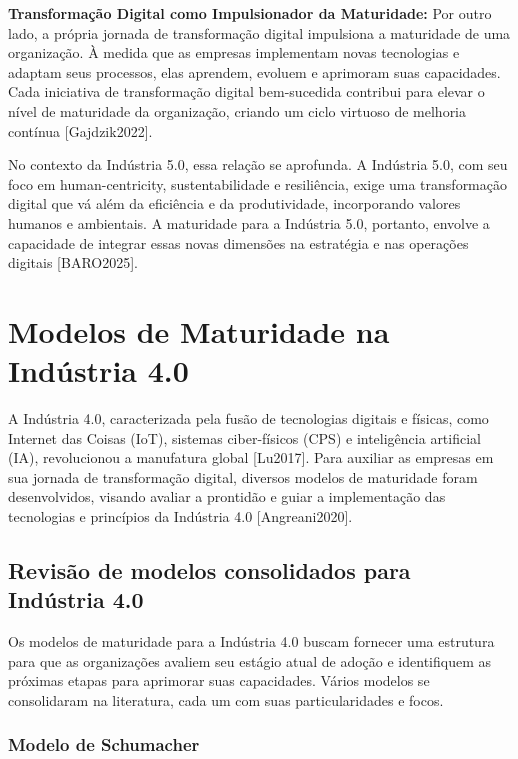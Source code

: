 \textbf{Transformação Digital como Impulsionador da Maturidade:}
Por outro lado, a própria jornada de transformação digital impulsiona a maturidade de uma organização. À medida que as empresas implementam novas tecnologias e adaptam seus processos, elas aprendem, evoluem e aprimoram suas capacidades. Cada iniciativa de transformação digital bem-sucedida contribui para elevar o nível de maturidade da organização, criando um ciclo virtuoso de melhoria contínua [Gajdzik2022].

No contexto da Indústria 5.0, essa relação se aprofunda. A Indústria 5.0, com seu foco em human-centricity, sustentabilidade e resiliência, exige uma transformação digital que vá além da eficiência e da produtividade, incorporando valores humanos e ambientais. A maturidade para a Indústria 5.0, portanto, envolve a capacidade de integrar essas novas dimensões na estratégia e nas operações digitais [BARO2025].





\section{Modelos de Maturidade na Indústria 4.0}

A Indústria 4.0, caracterizada pela fusão de tecnologias digitais e físicas, como Internet das Coisas (IoT), sistemas ciber-físicos (CPS) e inteligência artificial (IA), revolucionou a manufatura global [Lu2017]. Para auxiliar as empresas em sua jornada de transformação digital, diversos modelos de maturidade foram desenvolvidos, visando avaliar a prontidão e guiar a implementação das tecnologias e princípios da Indústria 4.0 [Angreani2020].

\subsection{Revisão de modelos consolidados para Indústria 4.0 }

Os modelos de maturidade para a Indústria 4.0 buscam fornecer uma estrutura para que as organizações avaliem seu estágio atual de adoção e identifiquem as próximas etapas para aprimorar suas capacidades. Vários modelos se consolidaram na literatura, cada um com suas particularidades e focos.

\subsubsection{Modelo de Schumacher}

